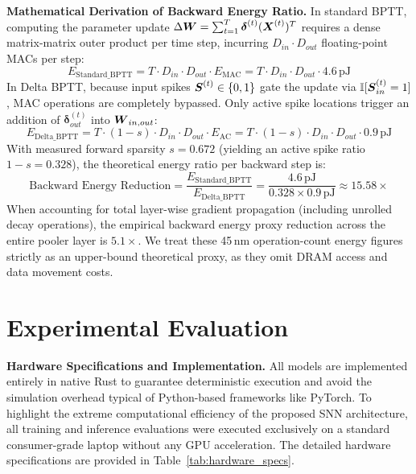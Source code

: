 \documentclass[10pt,a4paper,twoside]{article}
\begin{document}
\textbf{Mathematical Derivation of Backward Energy Ratio.} In standard BPTT, computing the parameter update $\Delta \boldsymbol{W} = \sum_{t=1}^T \boldsymbol{\delta}^{(t)} (\boldsymbol{X}^{(t)})^T$ requires a dense matrix-matrix outer product per time step, incurring $D_{in} \cdot D_{out}$ floating-point MACs per step:
\begin{equation}
E_{\text{Standard\_BPTT}} = T \cdot D_{in} \cdot D_{out} \cdot E_{\text{MAC}} = T \cdot D_{in} \cdot D_{out} \cdot 4.6\,\text{pJ}
\end{equation}
In Delta BPTT, because input spikes $\boldsymbol{S}^{(t)} \in \{0, 1\}$ gate the update via $\mathbb{I}[\boldsymbol{S}_{in}^{(t)}=1]$, MAC operations are completely bypassed. Only active spike locations trigger an addition of $\bm{\delta}_{out}^{(t)}$ into $\boldsymbol{W}_{in, out}$:
\begin{equation}
E_{\text{Delta\_BPTT}} = T \cdot (1-s) \cdot D_{in} \cdot D_{out} \cdot E_{\text{AC}} = T \cdot (1-s) \cdot D_{in} \cdot D_{out} \cdot 0.9\,\text{pJ}
\end{equation}
With measured forward sparsity $s = 0.672$ (yielding an active spike ratio $1-s = 0.328$), the theoretical energy ratio per backward step is:
\begin{equation}
\text{Backward Energy Reduction} = \frac{E_{\text{Standard\_BPTT}}}{E_{\text{Delta\_BPTT}}} = \frac{4.6\,\text{pJ}}{0.328 \times 0.9\,\text{pJ}} \approx 15.58\times
\end{equation}
When accounting for total layer-wise gradient propagation (including unrolled decay operations), the empirical backward energy proxy reduction across the entire pooler layer is $5.1\times$. We treat these 45\,nm operation-count energy figures strictly as an upper-bound theoretical proxy, as they omit DRAM access and data movement costs.


\section{Experimental Evaluation}

\textbf{Hardware Specifications and Implementation.} All models are implemented entirely in native Rust to guarantee deterministic execution and avoid the simulation overhead typical of Python-based frameworks like PyTorch. To highlight the extreme computational efficiency of the proposed SNN architecture, all training and inference evaluations were executed exclusively on a standard consumer-grade laptop without any GPU acceleration. The detailed hardware specifications are provided in Table~\ref{tab:hardware_specs}.
\end{document}
